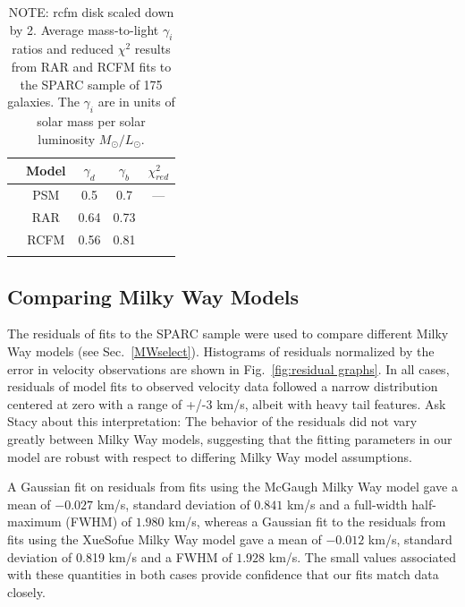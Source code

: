 \documentclass[reprint,%
 amsmath,amssymb,
 aps,
]{revtex4-1}
\begin{document}
    
    
    \begin{table}[h!]
        \centering
        \begin{tabular}{|c|c|c|c|c|}
        \hline
        &Model & $\gamma_d$ & $\gamma_b$& $\chi^2_{red}$ \\
        \hline
        \hline
           & PSM \cite{McGaugh2016RAR} & 0.5 &0.7&--- \\
            \hline
            \hline
         &   RAR	 &    0.64 &	0.73  & \\
         \hline
         &  RCFM   &  0.56 &	0.81&\\
           \hline\\ 
        \end{tabular}
        \caption{  {\color{teal}NOTE: rcfm disk scaled down by 2.}
          Average mass-to-light $\gamma_i$  ratios and reduced $\chi^2$  results from RAR and RCFM fits to the SPARC sample of 175 galaxies. The $\gamma_i$ are in units of  solar mass per solar luminosity $M_\odot/L_\odot$. }
        \label{tab:lobes}
    \end{table}
    
    
   \subsection{Comparing Milky Way Models} 
   
   
    The residuals of fits to the SPARC sample were used to compare different Milky Way models (see Sec.~\ref{MWselect}).  Histograms of residuals normalized by the error in velocity observations are shown in Fig.~\ref{fig:residual graphs}. 
     In all cases, residuals of model fits to observed velocity data followed a narrow distribution centered at zero with a range of +/-3 km/s, albeit with heavy tail features.  {\color{blue}Ask Stacy about this interpretation: The behavior of the residuals did not vary greatly between Milky Way models, suggesting that the fitting parameters in our model are robust with respect to differing Milky Way model assumptions.} 
    
    A Gaussian fit on residuals from fits using the McGaugh Milky Way model gave a mean of $-0.027$ km/s, standard deviation of $0.841$ km/s and a full-width half-maximum (FWHM) of $1.980$ km/s, whereas a Gaussian fit to the residuals from fits using the XueSofue Milky Way model gave a mean of $-0.012$ km/s, standard deviation of 0.819 km/s and a FWHM of  $1.928$ km/s. The small values associated with these quantities in both cases provide confidence that our fits match data closely.
    
\end{document}
